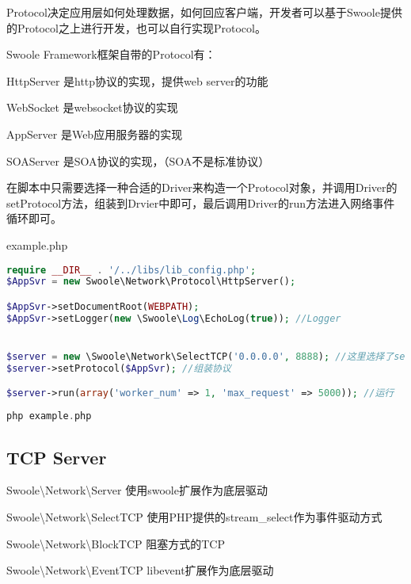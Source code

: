 Protocol决定应用层如何处理数据，如何回应客户端，开发者可以基于Swoole提供的Protocol之上进行开发，也可以自行实现Protocol。


Swoole Framework框架自带的Protocol有：

\begin{compactitem}
\item HttpServer 是http协议的实现，提供web server的功能
\item WebSocket 是websocket协议的实现
\item AppServer 是Web应用服务器的实现
\item SOAServer 是SOA协议的实现，（SOA不是标准协议）
\end{compactitem}

在脚本中只需要选择一种合适的Driver来构造一个Protocol对象，并调用Driver的setProtocol方法，组装到Drvier中即可，最后调用Driver的run方法进入网络事件循环即可。


\begin{example}
example.php
\begin{lstlisting}[language=PHP]
require __DIR__ . '/../libs/lib_config.php';
$AppSvr = new Swoole\Network\Protocol\HttpServer();

$AppSvr->setDocumentRoot(WEBPATH);
$AppSvr->setLogger(new \Swoole\Log\EchoLog(true)); //Logger


$server = new \Swoole\Network\SelectTCP('0.0.0.0', 8888); //这里选择了selectTCP驱动
$server->setProtocol($AppSvr); //组装协议

$server->run(array('worker_num' => 1, 'max_request' => 5000)); //运行
\end{lstlisting}
\end{example}


\begin{lstlisting}[language=PHP]
php example.php
\end{lstlisting}

\subsection{TCP Server}


\begin{compactitem}
\item Swoole\textbackslash Network\textbackslash Server 使用swoole扩展作为底层驱动
\item Swoole\textbackslash Network\textbackslash SelectTCP 使用PHP提供的stream\_select作为事件驱动方式
\item Swoole\textbackslash Network\textbackslash BlockTCP 阻塞方式的TCP
\item Swoole\textbackslash Network\textbackslash EventTCP libevent扩展作为底层驱动
\end{compactitem}

